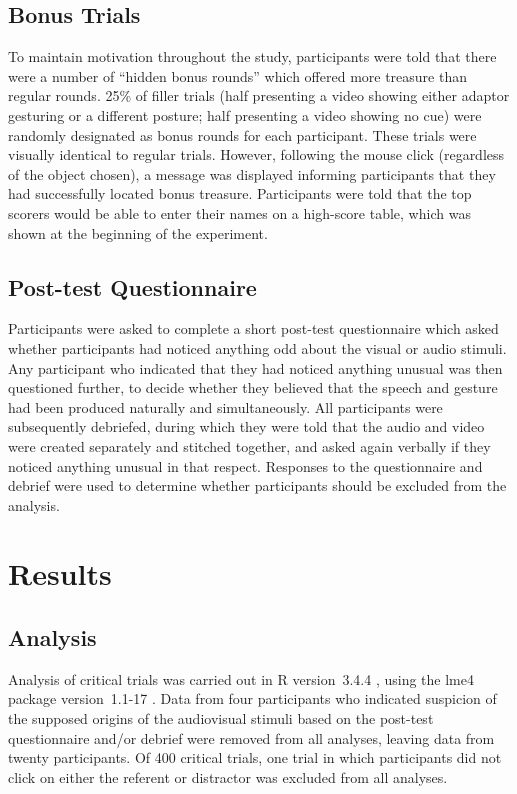 \documentclass[a4paper,man,natbib]{apa6}
\begin{document}
\subsection{Bonus Trials}
To maintain motivation throughout the study, participants were told that there were a number of ``hidden bonus rounds'' which offered more treasure than regular rounds.
25\% of filler trials (half presenting a video showing either adaptor gesturing or a different posture; half presenting a video showing no cue) were randomly designated as bonus rounds for each participant.
These trials were visually identical to regular trials.
However, following the mouse click (regardless of the object chosen), a message was displayed informing participants that they had successfully located bonus treasure.
Participants were told that the top scorers would be able to enter their names on a high-score table, which was shown at the beginning of the experiment. 

\subsection{Post-test Questionnaire}
Participants were asked to complete a short post-test questionnaire which asked whether participants had noticed anything odd about the visual or audio stimuli.
Any participant who indicated that they had noticed anything unusual was then questioned further, to decide whether they believed that the speech and gesture had been produced naturally and simultaneously.
All participants were subsequently debriefed, during which they were told that the audio and video were created separately and stitched together, and asked again verbally if they noticed anything unusual in that respect. 
Responses to the questionnaire and debrief were used to determine whether participants should be excluded from the analysis.

\section{Results}

\subsection{Analysis}
Analysis of critical trials was carried out in R version~3.4.4 \citep{Rbase2017}, using the lme4 package version~1.1-17 \citep{Bates2015}. 
Data from four participants who indicated suspicion of the supposed origins of the audiovisual stimuli based on the post-test questionnaire and/or debrief were removed from all analyses, leaving data from twenty participants. 
Of 400 critical trials, one trial in which participants did not click on either the referent or distractor was excluded from all analyses.
\end{document}
